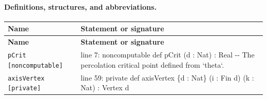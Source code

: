 \documentclass[10pt]{article}
\begin{document}
\paragraph{Definitions, structures, and abbreviations.}
\begin{longtable}{>{\raggedright\arraybackslash}p{} >{\raggedright\arraybackslash}p{}}
\textbf{Name} & \textbf{Statement or signature} \\
\hline
\endfirsthead
\textbf{Name} & \textbf{Statement or signature} \\
\hline
\endhead
\texttt{pCrit [noncomputable]} & {\ttfamily\scriptsize line 7:\allowbreak{} noncomputable def pCrit (\allowbreak{}d :\allowbreak{} Nat)\allowbreak{} :\allowbreak{} Real -\allowbreak{}-\allowbreak{} The percolation critical point defined from `theta`.\allowbreak{}} \\[0.45em]
\texttt{axisVertex [private]} & {\ttfamily\scriptsize line 59:\allowbreak{} private def axisVertex \{d :\allowbreak{} Nat\} (\allowbreak{}i :\allowbreak{} Fin d)\allowbreak{} (\allowbreak{}k :\allowbreak{} Nat)\allowbreak{} :\allowbreak{} Vertex d} \\[0.45em]
\end{longtable}
\end{document}
